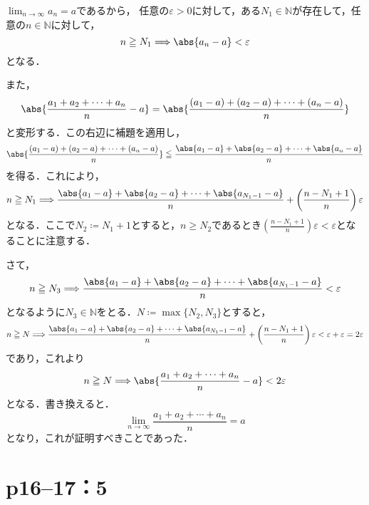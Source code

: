\begin{tproof}
    $\lim_{n \to \infty} a_n =a$であるから，
    任意の$\varepsilon >0$に対して，ある$N_1 \in \mathbb{N}$が存在して，任意の$n \in \mathbb{N}$に対して，
    \[
        n \ge N_1 \Longrightarrow \abs{a_n -a}<\varepsilon
    \]
    となる．

    また，
    \[
        \abs{\frac{a_1+a_2+\cdots+a_n}{n}-a}= \abs{\frac{(a_1-a)+(a_2-a)+\cdots+(a_n-a)}{n}}
    \]
    と変形する．この右辺に補題を適用し，
    \[
        \abs{\frac{(a_1-a)+(a_2-a)+\cdots+(a_n-a)}{n}} \leqq \frac{\abs{a_1-a}+\abs{a_2-a}+\cdots+\abs{a_n-a}}{n}
    \]
    を得る．これにより，
    \[
        n \ge N_1 \Longrightarrow \frac{\abs{a_1-a}+\abs{a_2-a}+\cdots+\abs{a_{N_1-1}-a}}{n} +\left( \frac{n-N_1+1}{n} \right ) \varepsilon
    \]
    となる．ここで$N_2 \coloneqq N_1 +1$とすると，$n \ge N_2$であるとき$\left( \frac{n-N_1+1}{n} \right ) \varepsilon < \varepsilon$となることに注意する．

    さて，
    \[
        n \ge N_3 \Longrightarrow \frac{\abs{a_1-a}+\abs{a_2-a}+\cdots+\abs{a_{N_1-1}-a}}{n}<\varepsilon
    \]
    となるように$N_3 \in \mathbb{N}$をとる．$N \coloneqq \max \{ N_2 , N_3 \}$とすると，
    \[
        n \ge N \Longrightarrow \frac{\abs{a_1-a}+\abs{a_2-a}+\cdots+\abs{a_{N_1-1}-a}}{n} +\left( \frac{n-N_1+1}{n} \right ) \varepsilon < \varepsilon + \varepsilon = 2 \varepsilon
    \]
    であり，これより
    \[
        n \ge N \Longrightarrow \abs{\frac{a_1+a_2+\cdots+a_n}{n}-a} < 2 \varepsilon
    \]
    となる．書き換えると．
    \[
        \lim_{n \to \infty} \frac{a_1+a_2+\cdots+a_n}{n}=a
    \]
    となり，これが証明すべきことであった．
\end{tproof}

\newpage

\section*{p16--17：5}

